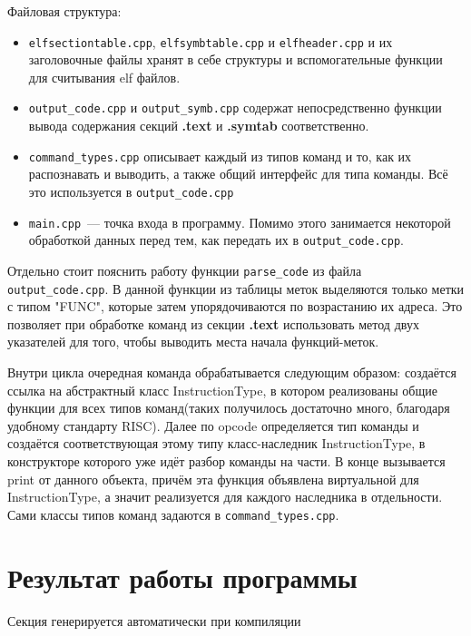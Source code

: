 \documentclass[14pt, russian, onesize]{extreport}
\begin{document}
Файловая структура:
\begin{itemize}
    \item \texttt{elfsectiontable.cpp}, \texttt{elfsymbtable.cpp} и
        \texttt{elfheader.cpp} и их
        заголовочные файлы хранят в себе структуры и вспомогательные
        функции для считывания elf файлов.
    \item 
        \texttt{output\_code.cpp} и \texttt{output\_symb.cpp} содержат
        непосредственно функции вывода содержания секций \textbf{.text}
        и \textbf{.symtab} соответственно.
    \item 
        \texttt{command\_types.cpp} описывает каждый из типов команд
        и то, как их распознавать и выводить, а также общий
        интерфейс для типа команды. Всё это используется в
        \texttt{output\_code.cpp}
    \item \texttt{main.cpp}~--- точка входа в программу. Помимо этого
        занимается некоторой обработкой данных перед тем, как 
        передать их в \texttt{output\_code.cpp}.
\end{itemize}

Отдельно стоит пояснить работу функции \texttt{parse\_code} из файла \texttt{output\_code.cpp}.
В данной функции из таблицы
меток выделяются только метки с типом "FUNC", которые затем упорядочиваются по возрастанию
их адреса. Это позволяет при обработке команд из секции \textbf{.text} 
использовать метод двух указателей для того, чтобы выводить места
начала функций-меток. 

Внутри цикла очередная команда обрабатывается следующим образом:
создаётся ссылка на абстрактный класс InstructionType, в котором реализованы
общие функции для всех типов команд(таких получилось достаточно много, благодаря удобному
стандарту RISC). Далее по opcode определяется тип команды и создаётся
соответствующая этому типу класс-наследник InstructionType, в конструкторе которого 
уже идёт разбор команды на части.
В конце вызывается print от данного объекта, причём
эта функция объявлена виртуальной для InstructionType, а значит 
реализуется для каждого наследника в отдельности. 
Сами классы типов команд задаются в \texttt{command\_types.cpp}.



\section*{Результат работы программы}
Секция генерируется автоматически при компиляции
\end{document}
